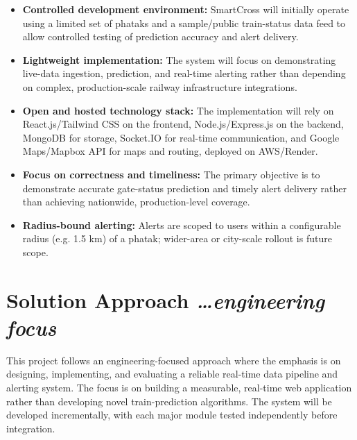 \documentclass[11pt,a4paper]{article}
\newcommand{\BvrHint}[1]{%
  {\normalfont\normalsize\itshape\hfill #1}}
\begin{document}
\begin{itemize}
    \item \textbf{Controlled development environment:} SmartCross will initially operate using a limited set of phataks and a sample/public train-status data feed to allow controlled testing of prediction accuracy and alert delivery.

    \item \textbf{Lightweight implementation:} The system will focus on demonstrating live-data ingestion, prediction, and real-time alerting rather than depending on complex, production-scale railway infrastructure integrations.

    \item \textbf{Open and hosted technology stack:} The implementation will rely on React.js/Tailwind CSS on the frontend, Node.js/Express.js on the backend, MongoDB for storage, Socket.IO for real-time communication, and Google Maps/Mapbox API for maps and routing, deployed on AWS/Render.

    \item \textbf{Focus on correctness and timeliness:} The primary objective is to demonstrate accurate gate-status prediction and timely alert delivery rather than achieving nationwide, production-level coverage.

    \item \textbf{Radius-bound alerting:} Alerts are scoped to users within a configurable radius (e.g. 1.5 km) of a phatak; wider-area or city-scale rollout is future scope.
\end{itemize}

\section{Solution Approach %
\BvrHint{\ldots engineering focus}}

This project follows an engineering-focused approach where the emphasis is on designing, implementing, and evaluating a reliable real-time data pipeline and alerting system. The focus is on building a measurable, real-time web application rather than developing novel train-prediction algorithms. The system will be developed incrementally, with each major module tested independently before integration.
\end{document}
